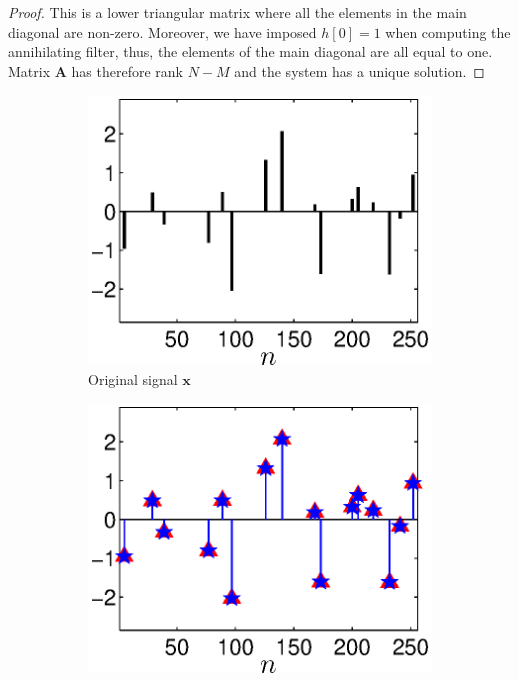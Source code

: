 \documentclass{article}
\def\x{{\bm x}}
\def\bhx{\bm{\hat{x}}}
\begin{document}
\begin{proof}
This is a lower triangular matrix where all the elements in the main diagonal are
non-zero. Moreover, we have imposed $h[0]=1$ when computing the annihilating filter,
thus, the elements of the main diagonal are all equal to one. Matrix $\bm{A}$
has therefore rank $N-M$ and the system has a unique solution. 

\end{proof}

\begin{figure}[t]
\centering
\begin{subfigure}{.22\textwidth}
\includegraphics[width=\linewidth]{figures/signal_M_256_K_16}
\caption{Original signal $\x$}
\end{subfigure}
\begin{subfigure}{.22\textwidth}
\includegraphics[width=\linewidth]{figures/signal_reconstr_M_256_N_32_K_16}

\end{subfigure}
\end{figure}
\end{document}
